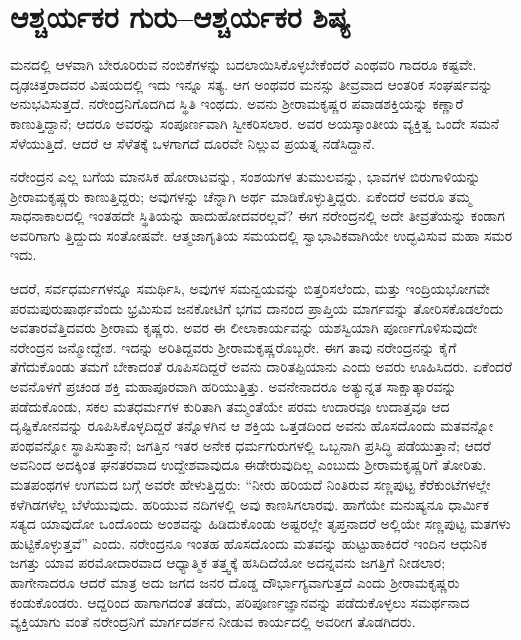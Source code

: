 
\chapter{ಆಶ್ಚರ್ಯಕರ ಗುರು–ಆಶ್ಚರ್ಯಕರ ಶಿಷ್ಯ}

\noindent

ಮನದಲ್ಲಿ ಆಳವಾಗಿ ಬೇರೂರಿರುವ ನಂಬಿಕೆಗಳನ್ನು ಬದಲಾಯಿಸಿಕೊಳ್ಳಬೇಕೆಂದರೆ ಎಂಥವರಿ ಗಾದರೂ ಕಷ್ಟವೇ. ದೃಢಚಿತ್ತರಾದವರ ವಿಷಯದಲ್ಲಿ ಇದು ಇನ್ನೂ ಸತ್ಯ. ಆಗ ಅಂಥವರ ಮನಸ್ಸು ತೀವ್ರವಾದ ಆಂತರಿಕ ಸಂಘರ್ಷವನ್ನು ಅನುಭವಿಸುತ್ತದೆ. ನರೇಂದ್ರನಿಗೊದಗಿದ ಸ್ಥಿತಿ ಇಂಥದು. ಅವನು ಶ್ರೀರಾಮಕೃಷ್ಣರ ಪವಾಡಶಕ್ತಿಯನ್ನು ಕಣ್ಣಾರೆ ಕಾಣುತ್ತಿದ್ದಾನೆ; ಆದರೂ ಅವರನ್ನು ಸಂಪೂರ್ಣವಾಗಿ ಸ್ವೀಕರಿಸಲಾರ. ಅವರ ಅಯಸ್ಕಾಂತೀಯ ವ್ಯಕ್ತಿತ್ವ ಒಂದೇ ಸಮನೆ ಸೆಳೆಯುತ್ತಿದೆ. ಆದರೆ ಆ ಸೆಳೆತಕ್ಕೆ ಒಳಗಾಗದೆ ದೂರವೇ ನಿಲ್ಲುವ ಪ್ರಯತ್ನ ನಡೆಸಿದ್ದಾನೆ.

ನರೇಂದ್ರನ ಎಲ್ಲ ಬಗೆಯ ಮಾನಸಿಕ ಹೋರಾಟವನ್ನು, ಸಂಶಯಗಳ ತುಮುಲವನ್ನು, ಭಾವಗಳ ಬಿರುಗಾಳಿಯನ್ನು ಶ್ರೀರಾಮಕೃಷ್ಣರು ಕಾಣುತ್ತಿದ್ದರು; ಅವುಗಳನ್ನು ಚೆನ್ನಾಗಿ ಅರ್ಥ ಮಾಡಿಕೊಳ್ಳುತ್ತಿದ್ದರು. ಏಕೆಂದರೆ ಅವರೂ ತಮ್ಮ ಸಾಧನಾಕಾಲದಲ್ಲಿ ಇಂತಹದೇ ಸ್ಥಿತಿಯನ್ನು ಹಾದುಹೋದವರಲ್ಲವೆ? ಈಗ ನರೇಂದ್ರನಲ್ಲಿ ಅದೇ ತೀವ್ರತೆಯನ್ನು ಕಂಡಾಗ ಅವರಿಗಾಗು ತ್ತಿದ್ದುದು ಸಂತೋಷವೇ. ಆತ್ಮಜಾಗೃತಿಯ ಸಮಯದಲ್ಲಿ ಸ್ವಾಭಾವಿಕವಾಗಿಯೇ ಉದ್ಭವಿಸುವ ಮಹಾ ಸಮರ ಇದು.

ಆದರೆ, ಸರ್ವಧರ್ಮಗಳನ್ನೂ ಸಮರ್ಥಿಸಿ, ಅವುಗಳ ಸಮನ್ವಯವನ್ನು ಬಿತ್ತರಿಸಲೆಂದು, ಮತ್ತು ಇಂದ್ರಿಯಭೋಗವೇ ಪರಮಪುರುಷಾರ್ಥವೆಂದು ಭ್ರಮಿಸುವ ಜನಕೋಟಿಗೆ ಭಗವ ದಾನಂದ ಪ್ರಾಪ್ತಿಯ ಮಾರ್ಗವನ್ನು ತೋರಿಸಕೊಡಲೆಂದು ಅವತಾರವೆತ್ತಿದವರು ಶ್ರೀರಾಮ ಕೃಷ್ಣರು. ಅವರ ಈ ಲೀಲಾಕಾರ್ಯವನ್ನು ಯಶಸ್ವಿಯಾಗಿ ಪೂರ್ಣಗೊಳಿಸುವುದೇ ನರೇಂದ್ರನ ಜನ್ಮೋದ್ದೇಶ. ಇದನ್ನು ಅರಿತಿದ್ದವರು ಶ್ರೀರಾಮಕೃಷ್ಣರೊಬ್ಬರೇ. ಈಗ ತಾವು ನರೇಂದ್ರನನ್ನು ಕೈಗೆ ತೆಗೆದುಕೊಂಡು ತಮಗೆ ಬೇಕಾದಂತೆ ರೂಪಿಸದಿದ್ದರೆ ಅವನು ದಾರಿತಪ್ಪಿಯಾನು ಎಂದು ಅವರು ಊಹಿಸಿದರು. ಏಕೆಂದರೆ ಅವನೊಳಗೆ ಪ್ರಚಂಡ ಶಕ್ತಿ ಮಹಾಪೂರವಾಗಿ ಹರಿಯುತ್ತಿತ್ತು. ಅವನೇನಾದರೂ ಅತ್ಯುನ್ನತ ಸಾಕ್ಷಾತ್ಕಾರವನ್ನು ಪಡೆದುಕೊಂಡು, ಸಕಲ ಮತಧರ್ಮಗಳ ಕುರಿತಾಗಿ ತಮ್ಮಂತೆಯೇ ಪರಮ ಉದಾರವೂ ಉದಾತ್ತವೂ ಆದ ದೃಷ್ಟಿಕೋನವನ್ನು ರೂಪಿಸಿಕೊಳ್ಳದಿದ್ದರೆ ತನ್ನೊಳಗಿನ ಆ ಶಕ್ತಿಯ ಒತ್ತಡದಿಂದ ಅವನು ಹೊಸದೊಂದು ಮತವನ್ನೋ ಪಂಥವನ್ನೋ ಸ್ಥಾಪಿಸುತ್ತಾನೆ; ಜಗತ್ತಿನ ಇತರ ಅನೇಕ ಧರ್ಮಗುರುಗಳಲ್ಲಿ ಒಬ್ಬನಾಗಿ ಪ್ರಸಿದ್ಧಿ ಪಡೆಯುತ್ತಾನೆ; ಆದರೆ ಅವನಿಂದ ಅದಕ್ಕಿಂತ ಘನತರವಾದ ಉದ್ದೇಶವಾವುದೂ ಈಡೇರುವುದಿಲ್ಲ ಎಂಬುದು ಶ್ರೀರಾಮಕೃಷ್ಣರಿಗೆ ತೋರಿತು. ಮತಪಂಥಗಳ ಉಗಮದ ಬಗ್ಗೆ ಅವರೇ ಹೇಳುತ್ತಿದ್ದರು: “ನೀರು ಹರಿಯದೆ ನಿಂತಿರುವ ಸಣ್ಣಪುಟ್ಟ ಕೆರೆಕುಂಟೆಗಳಲ್ಲೇ ಕಳೆಗಿಡಗಳೆಲ್ಲ ಬೆಳೆಯುವುದು. ಹರಿಯುವ ನದಿಗಳಲ್ಲಿ ಅವು ಕಾಣಸಿಗಲಾರವು. ಹಾಗೆಯೇ ಮನುಷ್ಯನೂ ಧಾರ್ಮಿಕ ಸತ್ಯದ ಯಾವುದೋ ಒಂದೊಂದು ಅಂಶವನ್ನು ಹಿಡಿದುಕೊಂಡು ಅಷ್ಟರಲ್ಲೇ ತೃಪ್ತನಾದರೆ ಅಲ್ಲಿಯೇ ಸಣ್ಣಪುಟ್ಟ ಮತಗಳು ಹುಟ್ಟಿಕೊಳ್ಳುತ್ತವೆ” ಎಂದು. ನರೇಂದ್ರನೂ ಇಂತಹ ಹೊಸದೊಂದು ಮತವನ್ನು ಹುಟ್ಟುಹಾಕಿದರೆ ಇಂದಿನ ಆಧುನಿಕ ಜಗತ್ತು ಯಾವ ಪರಮೋದಾರವಾದ ಆಧ್ಯಾತ್ಮಿಕ ತತ್ತ್ವಕ್ಕೆ ಹಸಿದಿದೆಯೋ ಅದನ್ನವನು ಜಗತ್ತಿಗೆ ನೀಡಲಾರ; ಹಾಗೇನಾದರೂ ಆದರೆ ಮಾತ್ರ ಅದು ಜಗದ ಜನರ ದೊಡ್ಡ ದೌರ್ಭಾಗ್ಯವಾಗುತ್ತದೆ ಎಂದು ಶ್ರೀರಾಮಕೃಷ್ಣರು ಕಂಡುಕೊಂಡರು. ಆದ್ದರಿಂದ ಹಾಗಾಗದಂತೆ ತಡೆದು, ಪರಿಪೂರ್ಣಜ್ಞಾನವನ್ನು ಪಡೆದುಕೊಳ್ಳಲು ಸಮರ್ಥನಾದ ವ್ಯಕ್ತಿಯಾಗು ವಂತೆ ನರೇಂದ್ರನಿಗೆ ಮಾರ್ಗದರ್ಶನ ನೀಡುವ ಕಾರ್ಯದಲ್ಲಿ ಅವರೀಗ ತೊಡಗಿದರು.

